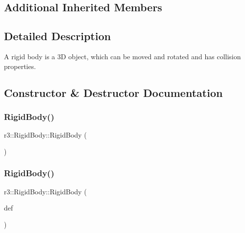 \subsection*{Additional Inherited Members}


\subsection{Detailed Description}
A rigid body is a 3D object, which can be moved and rotated and has collision properties. 

\subsection{Constructor \& Destructor Documentation}
\mbox{\label{classr3_1_1_rigid_body_a8acb625440a10d83a87e9139bc9429d5}} 
\subsubsection{\texorpdfstring{Rigid\+Body()}{RigidBody()}\hspace{0.1cm}{\footnotesize\ttfamily [1/2]}}
{\footnotesize\ttfamily r3\+::\+Rigid\+Body\+::\+Rigid\+Body (\begin{DoxyParamCaption}{ }\end{DoxyParamCaption})\hspace{0.3cm}{\ttfamily [explicit]}}

\mbox{\label{classr3_1_1_rigid_body_a5d12d73e66bca3b95a9597f064fa9d56}} 
\subsubsection{\texorpdfstring{Rigid\+Body()}{RigidBody()}\hspace{0.1cm}{\footnotesize\ttfamily [2/2]}}
{\footnotesize\ttfamily r3\+::\+Rigid\+Body\+::\+Rigid\+Body (\begin{DoxyParamCaption}\item[{const \mbox{\hyperlink{structr3_1_1_rigid_body_def}{Rigid\+Body\+Def}} \&}]{def }\end{DoxyParamCaption})\hspace{0.3cm}{\ttfamily [explicit]}}



